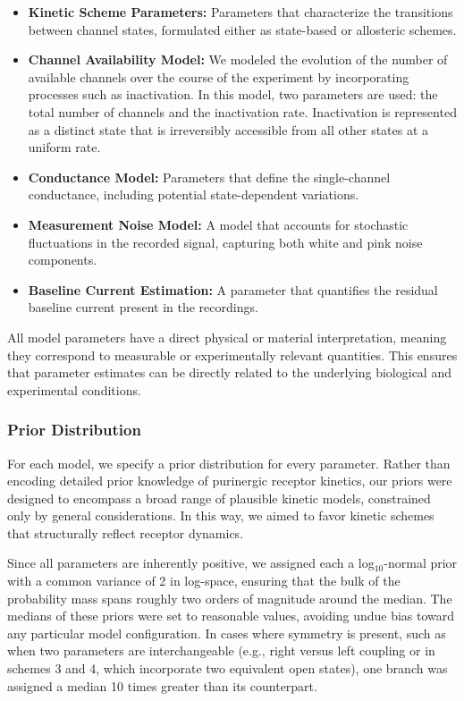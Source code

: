\documentclass[pdflatex,sn-nature]{sn-jnl}%
\begin{document}
\begin{itemize}
    \item \textbf{Kinetic Scheme Parameters:} Parameters that characterize the transitions between channel states, formulated either as state-based or allosteric schemes.
    \item \textbf{Channel Availability Model:} We modeled the evolution of the number of available channels over the course of the experiment by incorporating processes such as inactivation. In this model, two parameters are used: the total number of channels and the inactivation rate. Inactivation is represented as a distinct state that is irreversibly accessible from all other states at a uniform rate.
    \item \textbf{Conductance Model:} Parameters that define the single-channel conductance, including potential state-dependent variations. 
    \item \textbf{Measurement Noise Model:} A model that accounts for stochastic fluctuations in the recorded signal, capturing both white and pink noise components.
    \item \textbf{Baseline Current Estimation:} A parameter that quantifies the residual baseline current present in the recordings.
\end{itemize}


All model parameters have a direct physical or material interpretation, meaning they correspond to measurable or experimentally relevant quantities. This ensures that parameter estimates can be directly related to the underlying biological and experimental conditions.

\subsubsection{Prior Distribution}
For each model, we specify a prior distribution for every parameter. Rather than encoding detailed prior knowledge of purinergic receptor kinetics, our priors were designed to encompass a broad range of plausible kinetic models, constrained only by general considerations. In this way, we aimed to favor kinetic schemes that structurally reflect receptor dynamics.

Since all parameters are inherently positive, we assigned each a log$_{10}$-normal prior with a common variance of 2 in log-space, ensuring that the bulk of the probability mass spans roughly two orders of magnitude around the median. The medians of these priors were set to reasonable values, avoiding undue bias toward any particular model configuration. In cases where symmetry is present, such as when two parameters are interchangeable (e.g., right versus left coupling or in schemes 3 and 4, which incorporate two equivalent open states), one branch was assigned a median 10 times greater than its counterpart.
\end{document}
